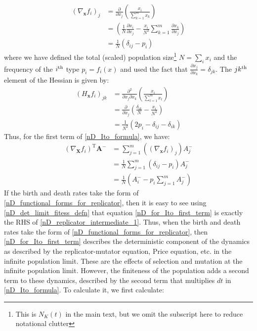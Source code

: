 \begin{align}
\left(\nabla_{\mathbf{x}} f_i\right)_j &= \frac{\partial }{\partial x_j}\left(\frac{x_i}{\sum\limits_{k=1}^{m}x_k}\right)\nonumber\\
&= \left(\frac{1}{N}\frac{\partial x_i}{\partial x_j} 
- \frac{x_i}{N^2}\sum\limits_{k=1}^{m}\frac{\partial x_k}{\partial x_j}\right)\nonumber\\
&= \frac{1}{N}\left(\delta_{ij}-p_i\right)\label{nD_jacobian_for_ito}
\end{align}
where we have defined the total (scaled) population size\footnote{This is $N_{K}(t)$ in the main text, but we omit the subscript here to reduce notational clutter}  $N = \sum_i x_i$ and the frequency of the $i\textsuperscript{th}$ type $p_i = f_i(x)$ and used the fact that $\frac{\partial x_j}{\partial x_k} = \delta_{jk}$. The $jk\textsuperscript{th}$ element of the Hessian is given by:
\begin{align}
\left(H_{\mathbf{x}} f_i\right)_{jk} &= \frac{\partial^2 }{\partial x_j \partial x_k}\left( \frac{x_i}{\sum\limits_{l=1}^{m}x_l}\right)\nonumber\\
&= \frac{\partial}{\partial x_j}\left(\frac{\delta_{ik}}{N}-\frac{x_i}{N^2}\right)\nonumber\\
&= \frac{1}{N^2}\left(2p_i - \delta_{ij}-\delta_{ik}\right)\label{nD_hessian_for_ito}
\end{align}
Thus, for the first term of \eqref{nD_Ito_formula}, we have:
\begin{align}
\left(\nabla_{\mathbf{X}}f_i\right)^{\mathrm{T}}\boldsymbol{\mathbf{A}^{-}} &= \sum\limits_{j=1}^{m}\left(\left(\nabla_{\mathbf{x}} f_i\right)_j\right)A^{-}_{j} \nonumber\\
&= \frac{1}{N}\sum\limits_{j=1}^{m}\left(\delta_{ij}-p_i\right)A^{-}_{j}\nonumber\\
&= \frac{1}{N}\left(A^{-}_{i} - p_i\sum\limits_{j=1}^{m}A^{-}_{j}\right)\label{nD_for_Ito_first_term}
\end{align}
If the birth and death rates take the form of \eqref{nD_functional_forms_for_replicator}, then it is easy to see using \eqref{nD_det_limit_fitess_defn} that equation \eqref{nD_for_Ito_first_term} is exactly the RHS of \eqref{nD_replicator_intermediate_1}. Thus, when the birth and death rates take the form of \eqref{nD_functional_forms_for_replicator}, then \eqref{nD_for_Ito_first_term} describes the deterministic component of the dynamics as described by the replicator-mutator equation, Price equation, etc. in the infinite population limit. These are the effects of selection and mutation at the infinite population limit. However, the finiteness of the population adds a second term to these dynamics, described by the second term that multiplies $dt$ in \eqref{nD_Ito_formula}. To calculate it, we first calculate:
